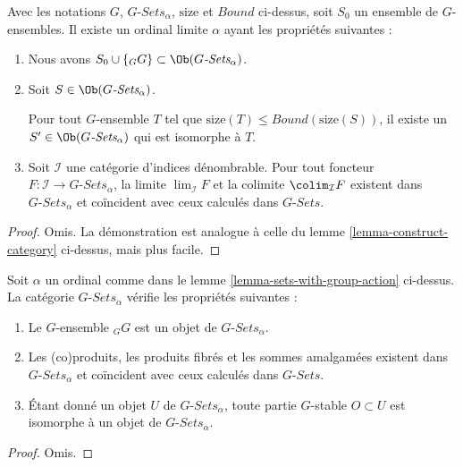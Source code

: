 \begin{lemma}
\label{lemma-sets-with-group-action}
Avec les notations $G$, $G\textit{-Sets}_\alpha$, $\text{size}$ et $Bound$
ci-dessus, soit $S_0$ un ensemble de $G$-ensembles.
Il existe un ordinal limite $\alpha$ ayant les propriétés suivantes :
\begin{enumerate}
\item Nous avons $S_0 \cup \{{}_GG\} \subset \Ob(G\textit{-Sets}_\alpha)$.
\item Soit $S \in \Ob(G\textit{-Sets}_\alpha)$.\par\noindent
Pour tout $G$-ensemble $T$ tel
que $\text{size}(T) \leq Bound(\text{size}(S))$, il existe un
$S' \in \Ob(G\textit{-Sets}_\alpha)$ qui est isomorphe à $T$.
\item Soit $\mathcal{I}$ une catégorie d'indices dénombrable. Pour tout foncteur
$F : \mathcal{I} \to G\textit{-Sets}_\alpha$, la limite
$\lim_\mathcal{I} F$ et la colimite $\colim_\mathcal{I} F$ existent dans
$G\textit{-Sets}_\alpha$ et coïncident avec ceux calculés dans $G\textit{-Sets}$.
\end{enumerate}
\end{lemma}

\begin{proof}
Omis. La démonstration est analogue à celle du
lemme \ref{lemma-construct-category} ci-dessus, mais plus facile.
\end{proof}

\begin{lemma}
\label{lemma-what-is-in-it-G-sets}
Soit $\alpha$ un ordinal comme dans le
lemme \ref{lemma-sets-with-group-action} ci-dessus. La catégorie
$G\textit{-Sets}_\alpha$ vérifie les propriétés suivantes :
\begin{enumerate}
\item Le $G$-ensemble ${}_GG$ est un objet de $G\textit{-Sets}_\alpha$.
\item Les (co)produits, les produits fibrés et les sommes amalgamées existent
dans $G\textit{-Sets}_\alpha$ et coïncident avec ceux calculés dans
$G\textit{-Sets}$.
\item Étant donné un objet $U$ de $G\textit{-Sets}_\alpha$, toute partie
$G$-stable $O \subset U$ est isomorphe à un objet de
$G\textit{-Sets}_\alpha$.
\end{enumerate}
\end{lemma}

\begin{proof}
Omis.
\end{proof}

